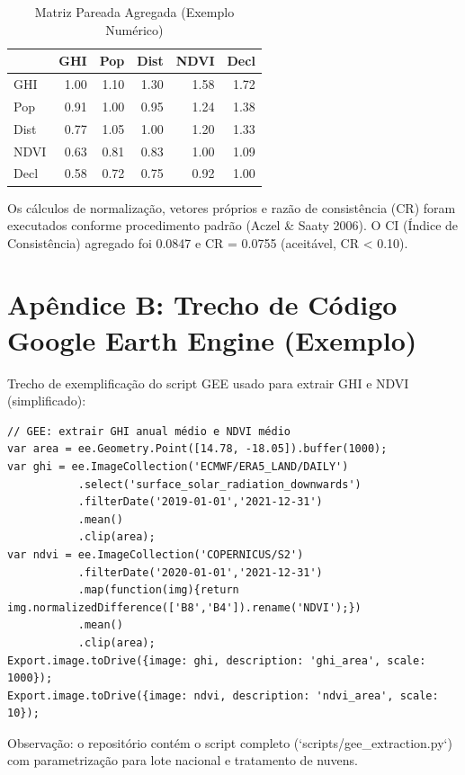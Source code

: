\documentclass[12pt, a4paper]{article}
\begin{document}
{{{{{{{{{{{{\begin{table}[H]
\centering
\caption{Matriz Pareada Agregada (Exemplo Numérico)}
\small
\begin{tabular}{lrrrrr}
\hline
 & GHI & Pop & Dist & NDVI & Decl \\
\hline
GHI   & 1.00 & 1.10 & 1.30 & 1.58 & 1.72 \\
Pop   & 0.91 & 1.00 & 0.95 & 1.24 & 1.38 \\
Dist  & 0.77 & 1.05 & 1.00 & 1.20 & 1.33 \\
NDVI  & 0.63 & 0.81 & 0.83 & 1.00 & 1.09 \\
Decl  & 0.58 & 0.72 & 0.75 & 0.92 & 1.00 \\
\hline
\end{tabular}
\end{table}

Os cálculos de normalização, vetores próprios e razão de consistência (CR) foram executados conforme procedimento padrão (Aczel & Saaty 2006). O CI (Índice de Consistência) agregado foi 0.0847 e CR = 0.0755 (aceitável, CR < 0.10).

\section*{Apêndice B: Trecho de Código Google Earth Engine (Exemplo)}

Trecho de exemplificação do script GEE usado para extrair GHI e NDVI (simplificado):

\begin{verbatim}
// GEE: extrair GHI anual médio e NDVI médio
var area = ee.Geometry.Point([14.78, -18.05]).buffer(1000);
var ghi = ee.ImageCollection('ECMWF/ERA5_LAND/DAILY')
           .select('surface_solar_radiation_downwards')
           .filterDate('2019-01-01','2021-12-31')
           .mean()
           .clip(area);
var ndvi = ee.ImageCollection('COPERNICUS/S2')
           .filterDate('2020-01-01','2021-12-31')
           .map(function(img){return img.normalizedDifference(['B8','B4']).rename('NDVI');})
           .mean()
           .clip(area);
Export.image.toDrive({image: ghi, description: 'ghi_area', scale: 1000});
Export.image.toDrive({image: ndvi, description: 'ndvi_area', scale: 10});
\end{verbatim}

Observação: o repositório contém o script completo (`scripts/gee_extraction.py`) com parametrização para lote nacional e tratamento de nuvens.

}}}}}}}}}}}}
\end{document}
